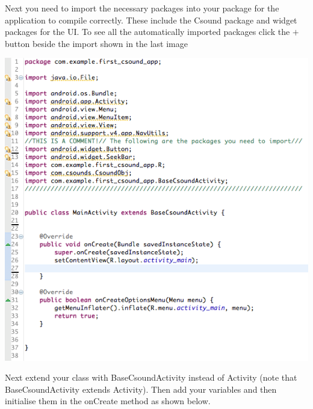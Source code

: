 \documentclass[11pt]{article}
\begin{document}
Next you need to import the necessary packages into your package for the application to compile correctly. These include the Csound package and widget packages for the UI. To see all the automatically imported packages click the $+$ button beside the import shown in the last image

\begin{center}
\includegraphics[scale=0.60]{images/ImportedPackages}
\end{center}


Next extend your class with BaseCsoundActivity instead of Activity (note that BaseCsoundActivity extends Activity). Then  add your variables and then initialise them in the onCreate method as shown below. 
\end{document}
